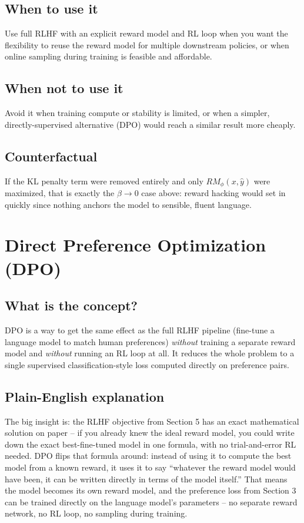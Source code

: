 \documentclass[11pt]{article}
\begin{document}
\subsection{When to use it}
Use full RLHF with an explicit reward model and RL loop when you want the
flexibility to reuse the reward model for multiple downstream policies, or when
online sampling during training is feasible and affordable.

\subsection{When not to use it}
Avoid it when training compute or stability is limited, or when a simpler,
directly-supervised alternative (DPO) would reach a similar result more cheaply.

\subsection{Counterfactual}
If the KL penalty term were removed entirely and only $RM_\phi(x,\hat y)$ were
maximized, that is exactly the $\beta \to 0$ case above: reward hacking would set
in quickly since nothing anchors the model to sensible, fluent language.

\section{Direct Preference Optimization (DPO)}

\subsection{What is the concept?}
DPO is a way to get the same effect as the full RLHF pipeline (fine-tune a
language model to match human preferences) \emph{without} training a separate
reward model and \emph{without} running an RL loop at all. It reduces the whole
problem to a single supervised classification-style loss computed directly on
preference pairs.

\subsection{Plain-English explanation}
The big insight is: the RLHF objective from Section 5 has an exact mathematical
solution on paper -- if you already knew the ideal reward model, you could write
down the exact best-fine-tuned model in one formula, with no trial-and-error RL
needed. DPO flips that formula around: instead of using it to compute the best
model from a known reward, it uses it to say ``whatever the reward model would
have been, it can be written directly in terms of the model itself.'' That
means the model becomes its own reward model, and the preference loss from
Section 3 can be trained directly on the language model's parameters -- no
separate reward network, no RL loop, no sampling during training.
\end{document}
